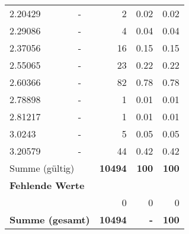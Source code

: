 \begin{longtable}{lXrrr}
        2.20429 & \multicolumn{1}{X}{-} & %
          \num{2} &
          \num[round-mode=places,round-precision=2]{0.02} &
          \num[round-mode=places,round-precision=2]{0.02} \\

        2.29086 & \multicolumn{1}{X}{-} & %
          \num{4} &
          \num[round-mode=places,round-precision=2]{0.04} &
          \num[round-mode=places,round-precision=2]{0.04} \\

        2.37056 & \multicolumn{1}{X}{-} & %
          \num{16} &
          \num[round-mode=places,round-precision=2]{0.15} &
          \num[round-mode=places,round-precision=2]{0.15} \\

        2.55065 & \multicolumn{1}{X}{-} & %
          \num{23} &
          \num[round-mode=places,round-precision=2]{0.22} &
          \num[round-mode=places,round-precision=2]{0.22} \\

        2.60366 & \multicolumn{1}{X}{-} & %
          \num{82} &
          \num[round-mode=places,round-precision=2]{0.78} &
          \num[round-mode=places,round-precision=2]{0.78} \\

        2.78898 & \multicolumn{1}{X}{-} & %
          \num{1} &
          \num[round-mode=places,round-precision=2]{0.01} &
          \num[round-mode=places,round-precision=2]{0.01} \\

        2.81217 & \multicolumn{1}{X}{-} & %
          \num{1} &
          \num[round-mode=places,round-precision=2]{0.01} &
          \num[round-mode=places,round-precision=2]{0.01} \\

        3.0243 & \multicolumn{1}{X}{-} & %
          \num{5} &
          \num[round-mode=places,round-precision=2]{0.05} &
          \num[round-mode=places,round-precision=2]{0.05} \\

        3.20579 & \multicolumn{1}{X}{-} & %
          \num{44} &
          \num[round-mode=places,round-precision=2]{0.42} &
          \num[round-mode=places,round-precision=2]{0.42} \\

     \midrule
     \multicolumn{2}{l}{Summe (gültig)} &
       \textbf{\num{10494}} &
     \textbf{\num{100}} &
       \textbf{\num[round-mode=places,round-precision=2]{100}} \\
     \multicolumn{5}{l}{\textbf{Fehlende Werte}}\\
      & & 0 & 0 & 0 \\
     \midrule
     \multicolumn{2}{l}{\textbf{Summe (gesamt)}} &
          \textbf{\num{10494}} &
        \textbf{-} &
        \textbf{\num{100}} \\
     \bottomrule
     \end{longtable}
     
